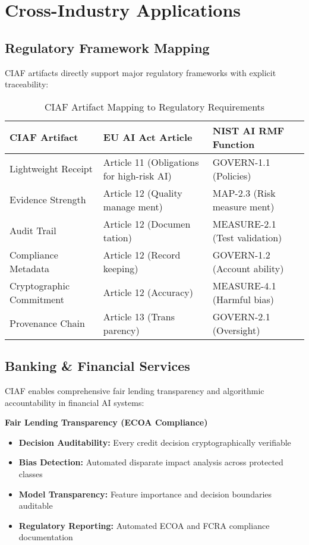 \documentclass[12pt,a4paper]{article}
\begin{document}
\section{Cross-Industry Applications}

\subsection{Regulatory Framework Mapping}

CIAF artifacts directly support major regulatory frameworks with explicit traceability:

\begin{table}[H]
\centering
\footnotesize
\renewcommand{\arraystretch}{1.3}
\begin{tabular}{|>{\raggedright\arraybackslash}p{3.5cm}|>{\raggedright\arraybackslash}p{5cm}|>{\raggedright\arraybackslash}p{4.5cm}|}
\hline
\textbf{CIAF Artifact} & \textbf{EU AI Act Article} & \textbf{NIST AI RMF Function} \\
\hline
Lightweight Receipt & Article 11 (Obligations for high-risk AI) & GOVERN-1.1 (Policies) \\
\hline
Evidence Strength & Article 12 (Quality manage ment) & MAP-2.3 (Risk measure ment) \\
\hline
Audit Trail & Article 12 (Documen tation) & MEASURE-2.1 (Test validation) \\
\hline
Compliance Metadata & Article 12 (Record keeping) & GOVERN-1.2 (Account ability) \\
\hline
Cryptographic Commitment & Article 12 (Accuracy) & MEASURE-4.1 (Harmful bias) \\
\hline
Provenance Chain & Article 13 (Trans parency) & GOVERN-2.1 (Oversight) \\
\hline
\end{tabular}
\caption{CIAF Artifact Mapping to Regulatory Requirements}
\label{tab:regulatory-mapping}
\end{table}

\subsection{Banking \& Financial Services}

CIAF enables comprehensive fair lending transparency and algorithmic accountability in financial AI systems:

\begin{valuebox}
\textbf{Fair Lending Transparency (ECOA Compliance)}
\begin{itemize}
\item \textbf{Decision Auditability:} Every credit decision cryptographically verifiable
\item \textbf{Bias Detection:} Automated disparate impact analysis across protected classes
\item \textbf{Model Transparency:} Feature importance and decision boundaries auditable
\item \textbf{Regulatory Reporting:} Automated ECOA and FCRA compliance documentation
\end{itemize}
\end{valuebox}
\end{document}
